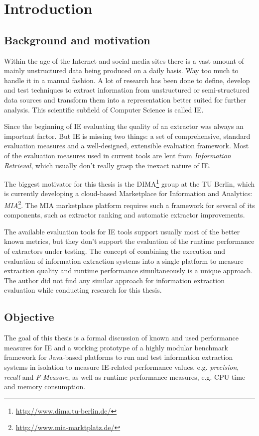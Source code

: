 \section{Introduction}

\subsection{Background and motivation}
Within the age of the Internet and social media sites there is a vast amount of mainly unstructured data being produced on a daily basis. Way too much to handle it in a manual fashion. A lot of research has been done to define, develop and test techniques to extract information from unstructured or semi-structured data sources and transform them into a representation better suited for further analysis. This scientific subfield of Computer Science is called \gls{IE}.

Since the beginning of \gls{IE} evaluating the quality of an extractor was always an important factor. But \gls{IE} is missing two things: a set of comprehensive, standard evaluation measures and a well-designed, extensible evaluation framework. Most of the evaluation measures used in current tools are lent from \textit{Information Retrieval}, which usually don't really grasp the inexact nature of \gls{IE}.

The biggest motivator for this thesis is the \gls{DIMA}\footnote{\url{http://www.dima.tu-berlin.de/}} group at the TU Berlin, which is currently developing a cloud-based Marketplace for Information and Analytics: \textit{MIA}\footnote{\url{http://www.mia-marktplatz.de/}}. The MIA marketplace platform requires such a framework for several of its components, such as extractor ranking and automatic extractor improvements.

The available evaluation tools for \gls{IE} tools support usually most of the better known metrics, but they don't support the evaluation of the runtime performance of extractors under testing. The concept of combining the execution and evaluation of information extraction systems into a single platform to measure extraction quality and runtime performance simultaneously is a unique approach. The author did not find any similar approach for information extraction evaluation while conducting research for this thesis.

\subsection{Objective}
The goal of this thesis is a formal discussion of known and used performance measures for IE and a working prototype of a highly modular benchmark framework for Java-based platforms to run and test information extraction systems in isolation to measure IE-related performance values, e.g. \textit{precision}, \textit{recall} and \textit{F-Measure}, as well as runtime performance measures, e.g. CPU time and memory consumption.

